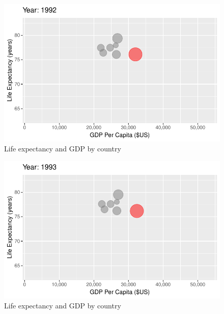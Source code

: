 \documentclass[
  letterpaper,
  DIV=11,
  numbers=noendperiod]{scrreport}
\theoremstyle{definition}
\theoremstyle{remark}
\begin{document}
\begin{figure}

{\centering \includegraphics{index_files/figure-pdf/fig-anim-country-73.pdf}

}

\caption{\label{fig-anim-country-73}Life expectancy and GDP by country}

\end{figure}

\begin{figure}

{\centering \includegraphics{index_files/figure-pdf/fig-anim-country-74.pdf}

}

\caption{\label{fig-anim-country-74}Life expectancy and GDP by country}

\end{figure}
\end{document}
